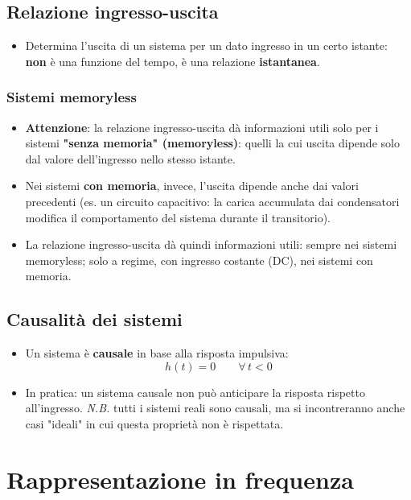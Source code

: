 \documentclass[12pt, a4paper]{article}
\begin{document}
\subsection{Relazione ingresso-uscita}
\begin{itemize}
    \item Determina l'uscita di un sistema per un dato ingresso in un certo istante: \textbf{non} è una funzione del tempo, è una relazione \textbf{istantanea}.
\end{itemize}

\subsubsection{Sistemi memoryless}
\begin{itemize}
    \item \textbf{Attenzione}: la relazione ingresso-uscita dà informazioni utili solo per i sistemi \textbf{"senza memoria" (memoryless)}: quelli la cui uscita dipende solo dal valore dell'ingresso nello stesso istante.
    \item Nei sistemi \textbf{con memoria}, invece, l'uscita dipende anche dai valori precedenti (es. un circuito capacitivo: la carica accumulata dai condensatori modifica il comportamento del sistema durante il transitorio).
    \item La relazione ingresso-uscita dà quindi informazioni utili: sempre nei sistemi memoryless; solo a regime, con ingresso costante (DC), nei sistemi con memoria.
\end{itemize}

\subsection{Causalità dei sistemi}
\begin{itemize}
    \item Un sistema è \textbf{causale} in base alla risposta impulsiva:
    $$h(t) = 0 \qquad \forall\, t<0$$
    \item In pratica: un sistema causale non può anticipare la risposta rispetto all'ingresso. \textit{N.B.} tutti i sistemi reali sono causali, ma si incontreranno anche casi "ideali" in cui questa proprietà non è rispettata.
\end{itemize}


\section{Rappresentazione in frequenza}
\end{document}
